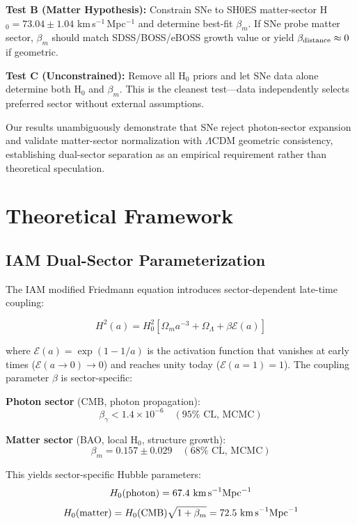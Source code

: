 \documentclass[twocolumn,superscriptaddress,prd,amsmath,amssymb]{revtex4-2}
\begin{document}
\textbf{Test B (Matter Hypothesis):} Constrain SNe to SH0ES matter-sector H$_0 = 73.04 \pm 1.04$ km\,s$^{-1}$\,Mpc$^{-1}$ and determine best-fit $\beta_m$. If SNe probe matter sector, $\beta_m$ should match SDSS/BOSS/eBOSS growth value or yield $\beta_{\rm distance} \approx 0$ if geometric.

\textbf{Test C (Unconstrained):} Remove all H$_0$ priors and let SNe data alone determine both H$_0$ and $\beta_m$. This is the cleanest test---data independently selects preferred sector without external assumptions.

Our results unambiguously demonstrate that SNe reject photon-sector expansion and validate matter-sector normalization with $\Lambda$CDM geometric consistency, establishing dual-sector separation as an empirical requirement rather than theoretical speculation.

\section{Theoretical Framework}

\subsection{IAM Dual-Sector Parameterization}

The IAM modified Friedmann equation introduces sector-dependent late-time coupling:

\begin{equation}
H^2(a) = H_0^2\left[\Omega_m a^{-3} + \Omega_\Lambda + \beta \mathcal{E}(a)\right]
\label{eq:friedmann}
\end{equation}

where $\mathcal{E}(a) = \exp(1 - 1/a)$ is the activation function that vanishes at early times ($\mathcal{E}(a \to 0) \to 0$) and reaches unity today ($\mathcal{E}(a=1) = 1$). The coupling parameter $\beta$ is sector-specific:

\textbf{Photon sector} (CMB, photon propagation):
\begin{equation}
\beta_\gamma < 1.4 \times 10^{-6} \quad (95\% \text{ CL, MCMC})
\end{equation}

\textbf{Matter sector} (BAO, local H$_0$, structure growth):
\begin{equation}
\beta_m = 0.157 \pm 0.029 \quad (68\% \text{ CL, MCMC})
\end{equation}

This yields sector-specific Hubble parameters:
\begin{equation}
H_0(\text{photon}) = 67.4 \text{ km\,s}^{-1}\text{Mpc}^{-1}
\end{equation}
\begin{equation}
H_0(\text{matter}) = H_0(\text{CMB})\sqrt{1+\beta_m} = 72.5 \text{ km\,s}^{-1}\text{Mpc}^{-1}
\end{equation}
\end{document}
